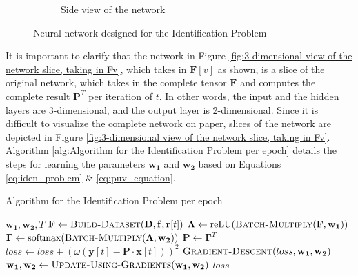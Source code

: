 \documentclass[12pt]{article}
\newcommand{\matr}[1]{\mathbf{#1}}  %
\begin{document}
\begin{figure}[H]
\begin{subfigure}{.35\textwidth}
            \caption{Side view of the network}
            \label{fig:Side view of the network}
        \end{subfigure}
        \caption{Neural network designed for the Identification Problem}
        \label{fig:Neural network designed for the Identification Problem}
    \end{figure}
    It is important to clarify that the network in Figure \ref{fig:3-dimensional view of the network slice, taking in Fv}, which takes in $\matr{F}[v]$ as shown, is a slice of the original network, which takes in the complete tensor $\matr{F}$ and computes the complete result $\matr{P}^{T}$  per iteration of $t$. In other words, the input and the hidden layers are 3-dimensional, and the output layer is 2-dimensional. Since it is difficult to visualize the complete network on paper, slices of the network are depicted in Figure \ref{fig:3-dimensional view of the network slice, taking in Fv}. Algorithm \ref{alg:Algorithm for the Identification Problem per epoch} details the steps for learning the parameters $\matr{w_1}$ and $\matr{w_2}$ based on Equations \ref{eq:iden_problem} \& \ref{eq:puv_equation}.\\
    \begin{algorithm}
        \caption{Algorithm for the Identification Problem per epoch} \label{alg:Algorithm for the Identification Problem per epoch}
        \begin{algorithmic}[1]
            \Require $\matr{w_1}, \matr{w_2}, T$
            \Function{Identify-Weights}{$\matr{x}, \matr{y}, \matr{r}, \matr{D}, \matr{f}, \omega$}
                \State $\matr{F} \gets \Call{Build-Dataset}{\matr{D}, \matr{f}, \matr{r}[t]}$
                \State $\matr{\Lambda} \gets \text{reLU}(\Call{Batch-Multiply}{\matr{F}, \matr{w_1}})$
                \State $\matr{\Gamma} \gets \text{softmax}(\Call{Batch-Multiply}{\matr{\Lambda}, \matr{w_2}})$
                \State $\matr{P} \gets \matr{\Gamma}^T$
                \State $loss \gets loss + (\omega(\matr{y}[t] - \matr{P} \cdot \matr{x}[t]))^2$
            \EndFor
            \State $\Call{Gradient-Descent}{loss, \matr{w_1}, \matr{w_2}}$
            \State $\matr{w_1}, \matr{w_2} \gets \Call{Update-Using-Gradients}{\matr{w_1}, \matr{w_2}}$
            \State \Return $loss$
            \EndFunction
        \end{algorithmic}
    \end{algorithm}
    
\end{document}
